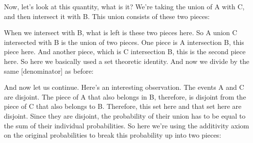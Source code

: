 \documentclass[pdftex, brazil, 12pt, twoside]{article}
\begin{document}
Now, let's look at this quantity,
what is it?
We're taking the union of A with C, and then intersect it
with B. This union consists of these two pieces:

\begin{figure}[H]
  \begin{center}
  \end{center}
\end{figure}

When we intersect with B, what is left is
these two pieces here.
So A union C intersected with B is the union of two pieces.
One piece is A intersection B, this piece here.
And another piece, which is C intersection B, this is the
second piece here.
So here we basically used a set theoretic identity.
And now we divide by the same [denominator]
as before:

\begin{figure}[H]
  \begin{center}
  \end{center}
\end{figure}

And now let us continue.
Here's an interesting observation.
The events A and C are disjoint.
The piece of A that also belongs in B, therefore, is
disjoint from the piece of C that also belongs to B.
Therefore, this set here and that set here are disjoint.
Since they are disjoint, the probability of their union has
to be equal to the sum of their individual
probabilities.
So here we're using the additivity axiom on the
original probabilities to break this probability up into
two pieces:
\end{document}
